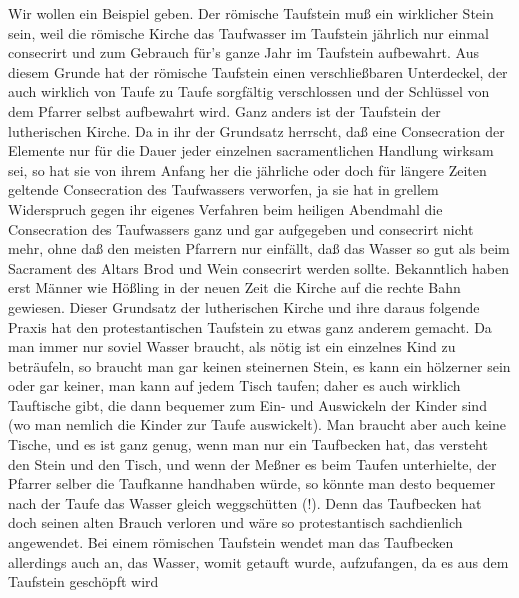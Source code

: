 Wir wollen ein Beispiel geben. Der römische Taufstein muß ein wirklicher Stein sein, weil die römische Kirche das Taufwasser im Taufstein jährlich nur einmal consecrirt und zum Gebrauch für’s ganze Jahr im Taufstein aufbewahrt. Aus diesem Grunde hat der römische Taufstein einen verschließbaren Unterdeckel, der auch wirklich von Taufe zu Taufe sorgfältig verschlossen und der Schlüssel von dem Pfarrer selbst aufbewahrt wird. Ganz anders ist der Taufstein der lutherischen Kirche. Da in ihr der Grundsatz herrscht, daß eine Consecration der Elemente nur für die Dauer jeder einzelnen sacramentlichen Handlung wirksam sei, so hat sie von ihrem
Anfang her die jährliche oder doch für längere Zeiten geltende Consecration des Taufwassers verworfen, ja sie hat in grellem Widerspruch gegen ihr eigenes Verfahren beim heiligen Abendmahl die Consecration des Taufwassers ganz und gar aufgegeben und consecrirt nicht mehr, ohne daß den meisten Pfarrern nur einfällt, daß das Wasser so gut als beim Sacrament des Altars Brod und Wein consecrirt werden sollte. Bekanntlich haben erst Männer wie Hößling in der neuen Zeit die Kirche auf die rechte Bahn gewiesen. Dieser Grundsatz der lutherischen Kirche und ihre daraus folgende Praxis hat den protestantischen Taufstein zu etwas ganz anderem gemacht. Da man immer nur soviel Wasser braucht, als nötig ist ein einzelnes Kind zu beträufeln, so braucht man gar keinen steinernen Stein, es kann ein hölzerner sein oder gar keiner, man kann auf jedem Tisch taufen; daher es auch wirklich Tauftische gibt, die dann bequemer zum Ein- und Auswickeln der Kinder sind (wo man nemlich die Kinder zur Taufe auswickelt). Man braucht aber auch keine Tische, und es ist ganz genug, wenn man nur ein Taufbecken hat, das versteht den Stein und den Tisch, und wenn der Meßner es beim Taufen unterhielte, der Pfarrer selber die Taufkanne handhaben würde, so könnte man desto bequemer nach der Taufe das Wasser gleich weggschütten (!). Denn das Taufbecken hat doch seinen alten Brauch verloren und wäre so protestantisch sachdienlich angewendet. Bei einem römischen Taufstein wendet man das Taufbecken allerdings auch an, das Wasser, womit getauft wurde, aufzufangen, da es aus dem Taufstein geschöpft wird
